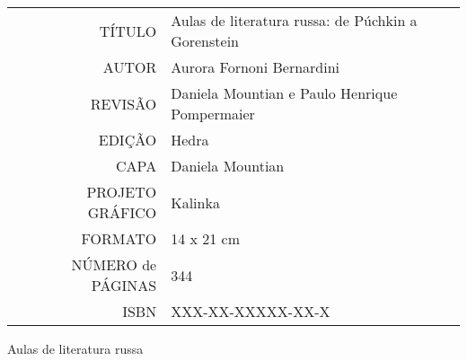 \bigskip

\begin{vplace}[1]
\begin{table}[ht!]
\MyriadPro
\scriptsize
\begin{tabular}{rl}
TÍTULO            & Aulas de literatura russa: de Púchkin a Gorenstein \\[2pt]
AUTOR             & Aurora Fornoni Bernardini                          \\[2pt]
REVISÃO           & Daniela Mountian e Paulo Henrique Pompermaier      \\[2pt]
EDIÇÃO            & Hedra                                              \\[2pt]
CAPA              & Daniela Mountian                                   \\[2pt]
PROJETO GRÁFICO   & Kalinka                                            \\[2pt]
FORMATO           & 14 x 21 cm                                         \\[2pt]
NÚMERO de PÁGINAS & 344                                                \\[2pt]
ISBN              & XXX-XX-XXXXX-XX-X                                 
\end{tabular}
\end{table}
\end{vplace}

\newpage
\MyriadPro
\begin{center}
\small
Aulas de literatura russa
\end{center}

\scriptsize

